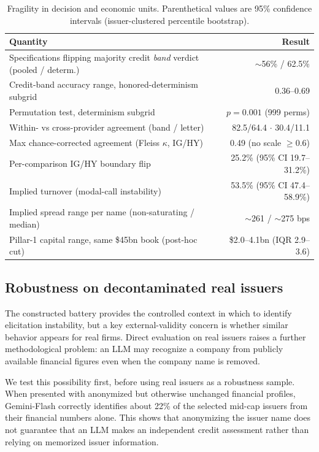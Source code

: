 \documentclass[a4paper,fleqn]{cas-sc}
\begin{document}
\begin{table}[t]\centering
\caption{Fragility in decision and economic units. Parenthetical values are 95\% confidence intervals
(issuer-clustered percentile bootstrap).}\label{tab:frag}
\begin{tabular}{lr}\toprule
Quantity & Result \\\midrule
Specifications flipping majority credit \emph{band} verdict (pooled / determ.) & $\sim$56\% / 62.5\% \\
Credit-band accuracy range, honored-determinism subgrid & 0.36--0.69 \\
Permutation test, determinism subgrid & $p=0.001$ (999 perms) \\
Within- vs cross-provider agreement (band / letter) & 82.5/64.4 $\cdot$ 30.4/11.1 \\
Max chance-corrected agreement (Fleiss $\kappa$, IG/HY) & 0.49 (no scale $\geq0.6$) \\
Per-comparison IG/HY boundary flip & 25.2\% (95\% CI 19.7--31.2\%) \\
Implied turnover (modal-call instability) & 53.5\% (95\% CI 47.4--58.9\%) \\
Implied spread range per name (non-saturating / median) & $\sim$261 / $\sim$275 bps \\
Pillar-1 capital range, same \$45bn book (post-hoc cut) & \$2.0--4.1bn (IQR 2.9--3.6) \\\bottomrule
\end{tabular}\end{table}

\subsection{Robustness on decontaminated real issuers}\label{sec:realarm}
The constructed battery provides the controlled context in which to identify elicitation instability, but
a key external-validity concern is whether similar behavior appears for real firms. Direct evaluation on
real issuers raises a further methodological problem: an LLM may recognize a company from publicly
available financial figures even when the company name is removed.

We test this possibility first, before using real issuers as a robustness sample. When presented with
anonymized but otherwise unchanged financial profiles, Gemini-Flash correctly identifies about 22\% of
the selected mid-cap issuers from their financial numbers alone. This shows that anonymizing the issuer
name does not guarantee that an LLM makes an independent credit assessment rather than relying on
memorized issuer information.
\end{document}
